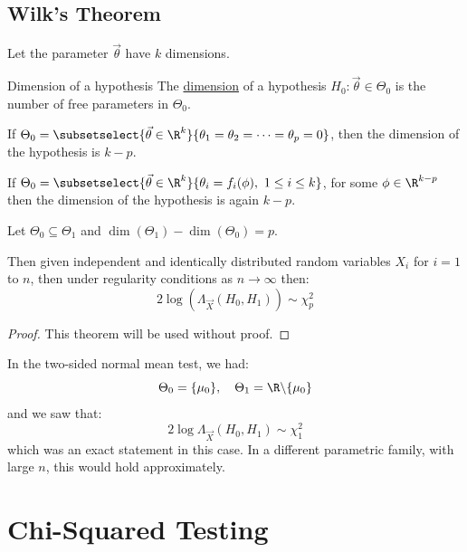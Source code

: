 \documentclass[../Main.tex]{subfiles}
\begin{document}
\subsection{Wilk's Theorem}
Let the parameter $\vec{\theta}$ have $k$ dimensions.
\begin{definition}{Dimension of a hypothesis}
    The \underline{dimension} of a hypothesis $H_0 : \vec{\theta} \in \Theta_0$ is the number of free parameters in $\Theta_0$.
\end{definition}
\begin{examples}{}
    \item If $\Theta_0 = \subsetselect{\vec{\theta} \in \R^k}{\theta_1 = \theta_2 = \cdots = \theta_p = 0}$, then the dimension of the hypothesis is $k - p$.
    \item If $\Theta_0 = \subsetselect{\vec{\theta} \in \R^k}{\theta_i = f_i(\phi),~1\leq i \leq k}$, for some $\phi \in \R^{k-p}$ then the dimension of the hypothesis is again $k - p$.
\end{examples}
\begin{theorem}
    Let $\Theta_0 \subseteq \Theta_1$ and $\dim(\Theta_1) - \dim(\Theta_0) = p$.

    Then given independent and identically distributed random variables $X_i$ for $i = 1$ to $n$, then under regularity conditions as $n \to \infty$ then:
    \begin{equation*}
        2\log(\Lambda_{\vec{X}}(H_0, H_1)) \sim \chi_p^2
    \end{equation*}
    \label{thmWilks}
\end{theorem}
\begin{proof}
    This theorem will be used without proof.
\end{proof}
\begin{example}
    In the two-sided normal mean test, we had:
    \begin{equation*}
        \Theta_0 = \{\mu_0\},\quad \Theta_1 = \R\backslash\{\mu_0\} \\
    \end{equation*}
    and we saw that:
    \begin{equation*}
        2\log{\Lambda_{\vec{X}}(H_0, H_1)} \sim \chi_1^2
    \end{equation*}
    which was an exact statement in this case. In a different parametric family, with large $n$, this would hold approximately.
\end{example}
\section{Chi-Squared Testing}
\end{document}

